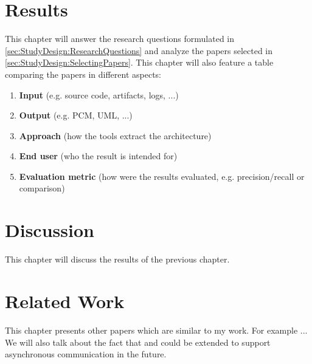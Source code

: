 \section{Results}
\label{cha:Results}
This chapter will answer the research questions formulated in \ref{sec:StudyDesign:ResearchQuestions} and analyze the papers selected in \ref{sec:StudyDesign:SelectingPapers}.
This chapter will also feature a table comparing the papers in different aspects:
\begin{enumerate}
	\item \textbf{Input} (e.g. source code, artifacts, logs, ...)
	\item \textbf{Output} (e.g. PCM, UML, ...)
	\item \textbf{Approach} (how the tools extract the architecture)
	\item \textbf{End user} (who the result is intended for)
	\item \textbf{Evaluation metric} (how were the results evaluated, e.g. precision/recall or comparison)
\end{enumerate}

\section{Discussion}
\label{cha:Discussion}
This chapter will discuss the results of the previous chapter.

\section{Related Work}
\label{cha:RelatedWork}
This chapter presents other papers which are similar to my work.
For example \cite{Ducasse2009} ...
We will also talk about the fact that \cite{Granchelli2017MicroART} and \cite{Langhammer2016} could be extended to support asynchronous communication in the future.




